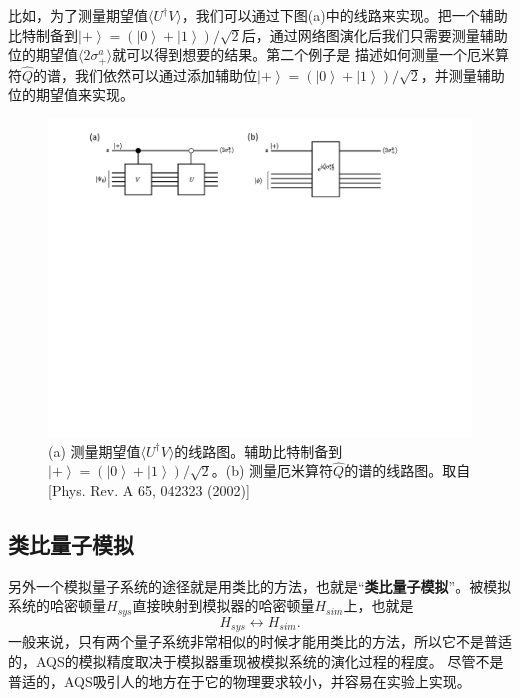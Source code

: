 比如，为了测量期望值$\langle U^{\dagger}V\rangle$，我们可以通过下图(a)中的线路来实现\cite{mea1}。把一个辅助比特制备到$\left\vert + \right\rangle=(\left\vert 0 \right\rangle+\left\vert 1 \right\rangle)/\sqrt{2}$后，通过网络图演化后我们只需要测量辅助位的期望值$\langle 2\sigma_{+}^a \rangle$就可以得到想要的结果。第二个例子是
描述如何测量一个厄米算符$\hat{Q}$的谱，我们依然可以通过添加辅助位$\left\vert + \right\rangle=(\left\vert 0 \right\rangle+\left\vert 1 \right\rangle)/\sqrt{2}$，并测量辅助位的期望值来实现。

        \begin{figure}[htbp]
            \begin{center}
              \includegraphics[width= 0.8\columnwidth]{figures/measure.pdf}
              \caption{(a) 测量期望值$\langle U^{\dagger}V\rangle$的线路图。辅助比特制备到$\left\vert + \right\rangle=(\left\vert 0 \right\rangle+\left\vert 1 \right\rangle)/\sqrt{2}$。(b) 测量厄米算符$\hat{Q}$的谱的线路图。取自[Phys. Rev. A 65, 042323 (2002)\cite{mea1}]
              }
              \label{measure}
            \end{center}
        \end{figure}

\subsection{类比量子模拟}

另外一个模拟量子系统的途径就是用类比的方法，也就是“\textbf{类比量子模拟}”。被模拟系统的哈密顿量$H_{sys}$直接映射到模拟器的哈密顿量$H_{sim}$上，也就是
 \begin{equation}\label{trotter}
 H_{sys}\longleftrightarrow H_{sim}.
\end{equation}
一般来说，只有两个量子系统非常相似的时候才能用类比的方法，所以它不是普适的，AQS的模拟精度取决于模拟器重现被模拟系统的演化过程的程度。
尽管不是普适的，AQS吸引人的地方在于它的物理要求较小，并容易在实验上实现。

